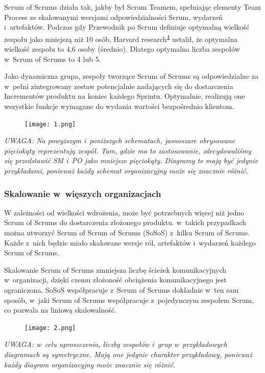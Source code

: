 \documentclass[12pt,a4paper,parskip=full]{scrartcl}
\begin{document}
Scrum of Scrums działa tak, jakby był Scrum Teamem, spełniając elementy Team Process ze skalowanymi wersjami odpowiedzialności Scrum, wydarzeń i~artefaktów. Podczas gdy Przewodnik po Scrum definiuje optymalną wielkość zespołu jako mniejszą niż 10 osób, Harvard research\textsuperscript{\hyperref[citation4]{4}} ustalił, że optymalna wielkość zespołu to 4,6 osoby (średnio). Dlatego optymalna liczba zespołów w~Scrum of Scrums to 4 lub 5.

Jako dynamiczna grupa, zespoły tworzące Scrum of Scrums są odpowiedzialne za w~pełni zintegrowany zestaw potencjalnie nadających się do dostarczenia Incrementów produktu na koniec każdego Sprintu. Optymalnie, realizują one wszystkie funkcje wymagane do wydania wartości bezpośrednio klientom.

\begin{figure}[H]
    \centering
    \texttt{[image: 1.png]}
\end{figure}

\emph{UWAGA: Na powyższym i~poniższych schematach, jasnoszare obrysowane pięciokąty reprezentują zespół. Tam, gdzie ma to zastosowanie, zdecydowaliśmy się przedstawić SM i~PO jako mniejsze pięciokąty. Diagramy te mają być jedynie przykładami, ponieważ każdy schemat organizacyjny może się znacznie różnić.}

\subsubsection{Skalowanie w~więszych organizacjach}\label{scaling-in-larger-organizations}

W zależności od wielkości wdrożenia, może być potrzebnych więcej niż jedno Scrum of Scrums do dostarczenia złożonego produktu. w~takich przypadkach można utworzyć Scrum of Scrum of Scrums (SoSoS) z~kilku Scrum of Scrums. Każde z~nich będzie miało skalowane wersje ról, artefaktów i~wydarzeń każdego Scrum of Scrums.

Skalowanie Scrum of Scrums zmniejsza liczbę ścieżek komunikacyjnych w~organizacji, dzięki czemu złożoność obciążenia komunikacyjnego jest ograniczona. SoSoS współpracuje z~Scrum of Scrums dokładnie w~ten sam sposób, w~jaki Scrum of Scrums współpracuje z~pojedynczym zespołem Scrum, co pozwala na liniową skalowalność.

\begin{figure}[H]
    \centering
    \texttt{[image: 2.png]}
\end{figure}

\emph{UWAGA: w~celu uproszczenia, liczby zespołów i~grup w~przykładowych diagramach są symetryczne. Mają one jedynie charakter przykładowy, ponieważ każdy diagram organizacyjny może znacznie się różnić.}
\end{document}
